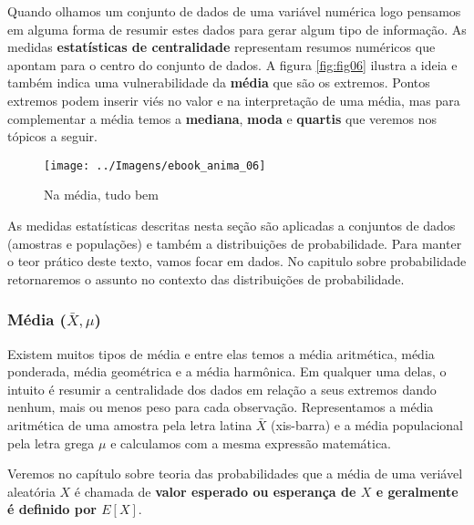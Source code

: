 \documentclass[11pt,]{style/krantz}
\renewenvironment{quote}{\begin{VF}}{\end{VF}}
\theoremstyle{definition}
\theoremstyle{definition}
\theoremstyle{definition}
\theoremstyle{remark}
\begin{document}
Quando olhamos um conjunto de dados de uma variável numérica logo pensamos em alguma forma de resumir estes dados para gerar algum tipo de informação. As medidas \textbf{estatísticas de centralidade} representam resumos numéricos que apontam para o centro do conjunto de dados. A figura \ref{fig:fig06} ilustra a ideia e também indica uma vulnerabilidade da \textbf{média} que são os extremos. Pontos extremos podem inserir viés no valor e na interpretação de uma média, mas para complementar a média temos a \textbf{mediana}, \textbf{moda} e \textbf{quartis} que veremos nos tópicos a seguir.

\begin{figure}[H]

{\centering \texttt{[image: ../Imagens/ebook\_anima\_06]}

}

\caption{Na média, tudo bem}\label{fig:fig07}
\end{figure}

\begin{quote}
As medidas estatísticas descritas nesta seção são aplicadas a conjuntos de dados (amostras e populações) e também a distribuições de probabilidade. Para manter o teor prático deste texto, vamos focar em dados. No capitulo sobre probabilidade retornaremos o assunto no contexto das distribuições de probabilidade.
\end{quote}

\hypertarget{media-bar-x-mu}{%
\subsubsection{\texorpdfstring{Média (\(\bar X, \mu\))}{Média (\textbackslash{}bar X, \textbackslash{}mu)}}\label{media-bar-x-mu}}

Existem muitos tipos de média e entre elas temos a média aritmética, média ponderada, média geométrica e a média harmônica. Em qualquer uma delas, o intuito é resumir a centralidade dos dados em relação a seus extremos dando nenhum, mais ou menos peso para cada observação. Representamos a média aritmética de uma amostra pela letra latina \(\bar X\) (xis-barra) e a média populacional pela letra grega \(\mu\) e calculamos com a mesma expressão matemática.

\begin{quote}
Veremos no capítulo sobre teoria das probabilidades que a média de uma veriável aleatória \(X\) é chamada de \textbf{valor esperado ou esperança de \(X\) e geralmente é definido por \(E[X]\)}.
\end{quote}
\end{document}
